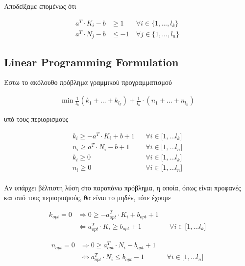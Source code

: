 \documentclass[12pt]{article}
\newcommand{\centered}[1]{\begin{align*}#1\end{align*}}
\begin{document}
Αποδείξαμε επομένως ότι

\begin{align*}
    a^{T} \cdot K_{i} -b & \geq 1 & \forall i \in \{1,...,l_{k}\} \\
    a^{T} \cdot N_{j} - b & \leq -1\ & \forall j \in \{1,...,l_{n}\}
\end{align*}

\pagebreak

\subsection{Linear Programming Formulation}

Έστω το ακόλουθο πρόβλημα γραμμικού προγραμματισμού

\centered{ \min \frac{1}{l_{k}} \left( k_{1} + \dotsc + k_{l_{k}} \right) + \frac{1}{l_{n}} \cdot \left( n_{1} + \dotsc + n_{l_{n}} \right) }

υπό τους περιορισμούς

\begin{align*}
k_{i} \geq -a^{T} \cdot K_{i} + b + 1 && \forall i \in \lbrack 1, \dotsc l_k \rbrack \\
n_{i} \geq a^{T} \cdot N_{i} - b + 1 && \forall i \in \lbrack 1, \dotsc l_n \rbrack \\
k_{i} \geq 0 && \forall i \in \lbrack 1, \dotsc l_k \rbrack \\
n_{i} \geq 0 && \forall i \in \lbrack 1, \dotsc l_n \rbrack \\
\end{align*}

Αν υπάρχει βέλτιστη λύση στο παραπάνω πρόβλημα,
η οποία, όπως είναι προφανές και από τους περιορισμούς, θα είναι το μηδέν,
τότε έχουμε

\begin{align*}
    k_{opt} = 0 & \Rightarrow 0 \geq -a^{T}_{opt} \cdot K_{i} + b_{opt} + 1 \\
    &\Leftrightarrow a^{T}_{opt} \cdot K_{i} \geq b_{opt} + 1 && \forall i \in \lbrack 1, \dotsc l_k \rbrack
\end{align*}

\begin{align*}
    n_{opt} = 0 & \Rightarrow 0 \geq a^{T}_{opt} \cdot N_{i} - b_{opt} + 1 \\
    &\Leftrightarrow a^{T}_{opt} \cdot N_{i} \leq b_{opt} - 1 && \forall i \in \lbrack 1, \dotsc l_n \rbrack
\end{align*} \\
\end{document}
